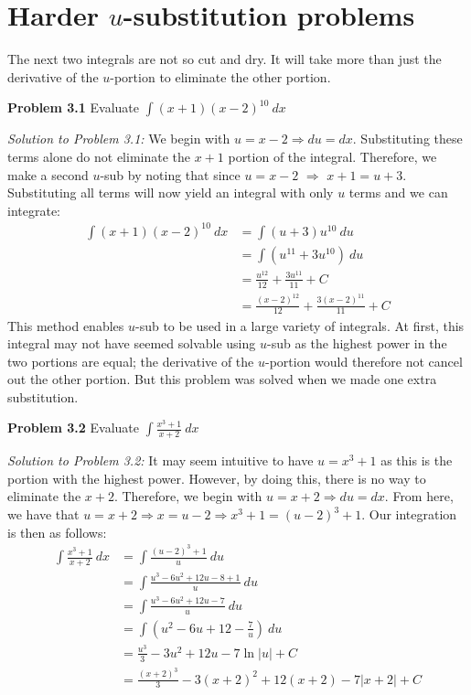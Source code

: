 \documentclass[11pt]{scrartcl}
\begin{document}
\section{Harder $u$-substitution problems}
The next two integrals are not so cut and dry. It will take more than just the derivative of the $u$-portion to eliminate the other portion.
\begin{tcolorbox}[colback=purple!5!white,colframe=purple!75!black]
\textbf{Problem 3.1} Evaluate $\int (x+1)(x-2)^{10}\ dx$ 
\end{tcolorbox} 
\noindent 
\textit{Solution to Problem 3.1:} We begin with $u=x-2 \Rightarrow du=dx$. Substituting these terms alone do not eliminate the $x+1$ portion of the integral. Therefore, we make a second $u$-sub by noting that since $u=x-2$ $\Rightarrow$ $x+1=u+3$. Substituting all terms will now yield an integral with only $u$ terms and we can integrate:
\begin{align*}
    \int (x+1)(x-2)^{10}\ dx &= \int (u+3)u^{10} \ du \\
                             &= \int (u^{11}+3u^{10}) \ du \\
                             &= \frac{u^{12}}{12}+\frac{3u^{11}}{11}+C \\
                             &=\frac{(x-2)^{12}}{12}+\frac{3(x-2)^{11}}{11}+C
\end{align*}
\noindent 
This method enables $u$-sub to be used in a large variety of integrals. At first, this integral may not have seemed solvable using $u$-sub as the highest power in the two portions are equal; the derivative of the $u$-portion would therefore not cancel out the other portion. But this problem was solved when we made one extra substitution.
\begin{tcolorbox}[colback=purple!5!white,colframe=purple!75!black]
\textbf{Problem 3.2} Evaluate $\int \frac{x^3+1}{x+2} \ dx$
\end{tcolorbox}
\noindent 
\textit{Solution to Problem 3.2:} It may seem intuitive to have $u=x^3+1$ as this is the portion with the highest power. However, by doing this, there is no way to eliminate the $x+2$. Therefore, we begin with $u=x+2 \Rightarrow du=dx$. From here, we have that $u=x+2 \Rightarrow x=u-2 \Rightarrow x^3+1=(u-2)^3+1$. Our integration is then as follows: 
\begin{align*}
    \int \frac{x^3+1}{x+2} \ dx &=\int \frac{(u-2)^3+1}{u} \ du \\
                                &=\int \frac{u^3-6u^2+12u-8+1}{u} \ du \\
                                &=\int \frac{u^3-6u^2+12u-7}{u} \ du \\
                                &=\int (u^2-6u+12-\frac{7}{u}) \ du \\
                                &=\frac{u^3}{3}-3u^2+12u-7\ln \lvert u \rvert +C \\
                                &=\frac{(x+2)^3}{3}-3(x+2)^2+12(x+2)-7 \lvert x+2 \rvert +C
\end{align*}
\end{document}
